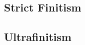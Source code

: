 \subsection{Strict Finitism}\label{sec:strict_finitism}

\subsection{Ultrafinitism}\label{sec:ultrafinitism}
